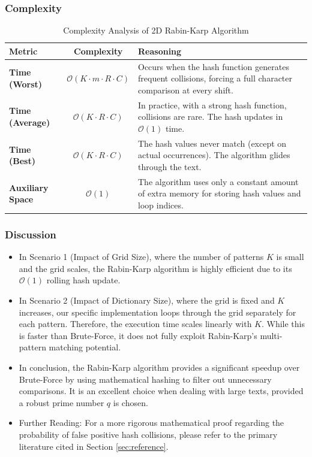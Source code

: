 \subsubsection{Complexity}

\begin{table}[H]
\centering
\renewcommand{\arraystretch}{1.5}
\begin{tabular}{|l|c|p{8cm}|}
\hline
\textbf{Metric} & \textbf{Complexity} & \textbf{Reasoning} \\
\hline
\textbf{Time (Worst)} & $\mathcal{O}(K \cdot m \cdot R \cdot C)$ & Occurs when the hash function generates frequent collisions, forcing a full character comparison at every shift. \\
\hline
\textbf{Time (Average)} & $\mathcal{O}(K \cdot R \cdot C)$ & In practice, with a strong hash function, collisions are rare. The hash updates in $\mathcal{O}(1)$ time. \\
\hline
\textbf{Time (Best)} & $\mathcal{O}(K \cdot R \cdot C)$ & The hash values never match (except on actual occurrences). The algorithm glides through the text. \\
\hline
\textbf{Auxiliary Space} & $\mathcal{O}(1)$ & The algorithm uses only a constant amount of extra memory for storing hash values and loop indices. \\
\hline
\end{tabular}
\caption{Complexity Analysis of 2D Rabin-Karp Algorithm}
\end{table}

\subsubsection{Discussion}
\begin{itemize}
    \item In Scenario 1 (Impact of Grid Size), where the number of patterns $K$ is small and the grid scales, the Rabin-Karp algorithm is highly efficient due to its $\mathcal{O}(1)$ rolling hash update.
    \item In Scenario 2 (Impact of Dictionary Size), where the grid is fixed and $K$ increases, our specific implementation loops through the grid separately for each pattern. 
    Therefore, the execution time scales linearly with $K$. While this is faster than Brute-Force, it does not fully exploit Rabin-Karp's multi-pattern matching potential.
    \item In conclusion, the Rabin-Karp algorithm provides a significant speedup over Brute-Force by using mathematical hashing to filter out unnecessary comparisons. 
    It is an excellent choice when dealing with large texts, provided a robust prime number $q$ is chosen.
    \item Further Reading: For a more rigorous mathematical proof regarding the probability of false positive hash collisions, please refer to the primary literature cited in Section \ref{sec:reference}.
\end{itemize}